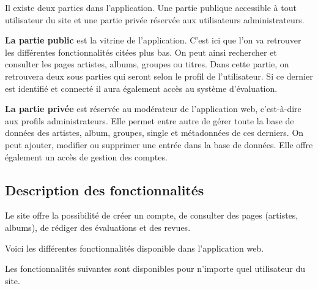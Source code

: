        \begin{paragraphe}
            Il existe deux parties dans l'application. Une partie publique accessible à tout utilisateur du site et une partie
            privée réservée aux utilisateurs administrateurs.
        \end{paragraphe}

        \begin{paragraphe}
            \textbf{La partie public} est la vitrine de l'application. C'est ici que l'on
            va retrouver les différentes fonctionnalités citées plus bas. On peut
            ainsi rechercher et consulter les pages artistes, albums, groupes ou titres.
            Dans cette partie, on retrouvera deux sous parties qui seront selon le profil de 
            l'utilisateur.
            Si ce dernier est identifié et connecté il aura également accès au système d'évaluation.

            \textbf{La partie privée} est réservée au modérateur de l'application web, c'est-à-dire 
            aux profils administrateurs.
            Elle permet entre autre de gérer toute la base de données des artistes,
            album, groupes, single et métadonnées de ces derniers. On peut ajouter, modifier
            ou supprimer une entrée dans la base de données.
            Elle offre également un accès de gestion des comptes.
        \end{paragraphe}

    \subsection{Description des fonctionnalités}

        \begin{paragraphe}
            Le site offre la possibilité de créer un compte, de consulter des pages
            (artistes, albums), de rédiger des évaluations et des revues.
        \end{paragraphe}

        \begin{paragraphe}
            Voici les différentes fonctionnalités disponible dans l'application web.
        \end{paragraphe}

        \begin{paragraphe}
            Les fonctionnalités suivantes sont disponibles pour n'importe quel utilisateur du site.
        \end{paragraphe}

